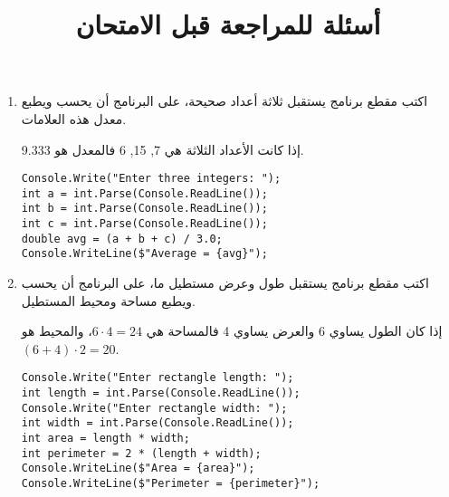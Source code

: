 ﻿\documentclass[12pt]{article}
\begin{document}
\title{أسئلة للمراجعة قبل الامتحان}

\maketitle
\thispagestyle{fancy}

\begin{enumerate}[itemsep=2em]

\item
       اكتب مقطع برنامج يستقبل ثلاثة أعداد صحيحة، على البرنامج أن يحسب ويطبع معدل هذه العلامات.\\
     \begin{boxExample}
     إذا كانت الأعداد الثلاثة هي 7, 15, 6 فالمعدل هو 9.333.
     \end{boxExample}

\ifwithsols
\begin{boxSolution}
\begin{english}
\begin{verbatim}
Console.Write("Enter three integers: ");
int a = int.Parse(Console.ReadLine());
int b = int.Parse(Console.ReadLine());
int c = int.Parse(Console.ReadLine());
double avg = (a + b + c) / 3.0;
Console.WriteLine($"Average = {avg}");
\end{verbatim}
\end{english}
\end{boxSolution}
\clearpage
\fi

\item
          اكتب مقطع برنامج يستقبل طول وعرض مستطيل ما، على البرنامج أن يحسب ويطبع مساحة ومحيط المستطيل. \\
    \begin{boxExample}
    إذا كان الطول يساوي 6 والعرض يساوي 4 فالمساحة هي $6 \cdot 4 = 24$، والمحيط هو $ (6 + 4) \cdot 2 = 20$.
    \end{boxExample}

\ifwithsols
\begin{boxSolution}
\begin{english}
\begin{verbatim}
Console.Write("Enter rectangle length: ");
int length = int.Parse(Console.ReadLine());
Console.Write("Enter rectangle width: ");
int width = int.Parse(Console.ReadLine());
int area = length * width;
int perimeter = 2 * (length + width);
Console.WriteLine($"Area = {area}");
Console.WriteLine($"Perimeter = {perimeter}");
\end{verbatim}
\end{english}
\end{boxSolution}
\clearpage
\fi


\end{enumerate}
\end{document}
